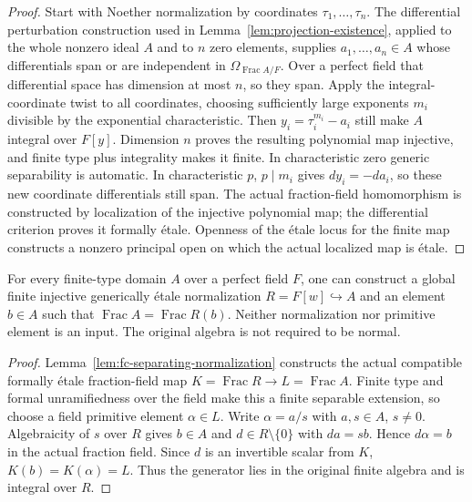 \begin{proof}
Start with Noether normalization by coordinates $\tau_1,\ldots,\tau_n$. The differential perturbation
construction used in Lemma~\ref{lem:projection-existence}, applied to the whole nonzero ideal $A$ and to $n$
zero elements, supplies $a_1,\ldots,a_n\in A$ whose differentials span or are independent in
$\Omega_{\operatorname{Frac}A/F}$. Over a perfect field that differential space has dimension at most $n$,
so they span. Apply the integral-coordinate twist to all coordinates, choosing sufficiently large exponents
$m_i$ divisible by the exponential characteristic. Then $y_i=\tau_i^{m_i}-a_i$ still make $A$ integral over
$F[y]$. Dimension $n$ proves the resulting polynomial map injective, and finite type plus integrality makes it finite.
In characteristic zero generic separability is automatic. In characteristic $p$, $p\mid m_i$ gives
$dy_i=-da_i$, so these new coordinate differentials still span. The actual fraction-field homomorphism is
constructed by localization of the injective polynomial map; the differential criterion proves it formally
\'etale. Openness of the \'etale locus for the finite map constructs a nonzero principal open on which the
actual localized map is \'etale.
\end{proof}

\begin{lemma}\label{lem:fc-integral-primitive-element}
\leanok
{}
For every finite-type domain $A$ over a perfect field $F$, one can construct a global finite injective
generically \'etale normalization $R=F[w]\hookrightarrow A$ and an element $b\in A$ such that
$\operatorname{Frac}A=\operatorname{Frac}R(b)$. Neither normalization nor primitive element is an input.
The original algebra is not required to be normal.
\end{lemma}

\begin{proof}
Lemma~\ref{lem:fc-separating-normalization} constructs the actual compatible formally \'etale fraction-field
map $K=\operatorname{Frac}R\to L=\operatorname{Frac}A$. Finite type and formal unramifiedness over the field
make this a finite separable extension, so choose a field primitive element $\alpha\in L$.
Write $\alpha=a/s$ with $a,s\in A$, $s\ne0$. Algebraicity of $s$ over $R$ gives $b\in A$ and
$d\in R\setminus\{0\}$ with $da=sb$. Hence $d\alpha=b$ in the actual fraction field. Since $d$ is an invertible
scalar from $K$, $K(b)=K(\alpha)=L$. Thus the generator lies in the original finite algebra and is integral over $R$.
\end{proof}

